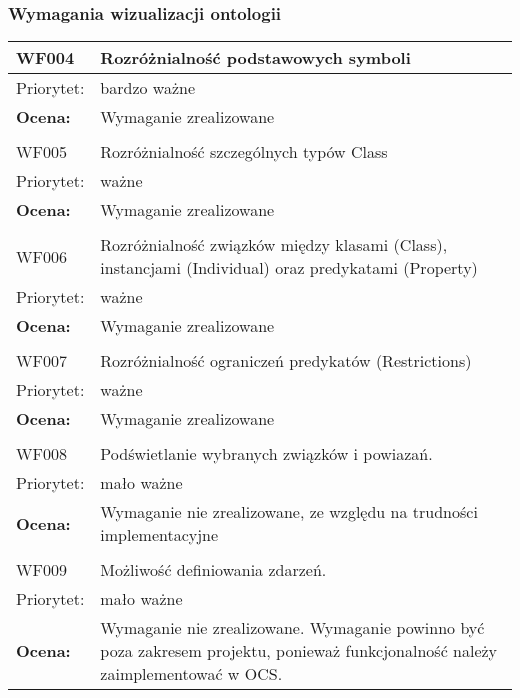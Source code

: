 \subsubsection{Wymagania wizualizacji ontologii}

\begin{center}
\begin{tabular}{|m{3cm}|m{9cm}|} \hline

WF004 & Rozróżnialność podstawowych symboli  \\ \hline
Priorytet: & bardzo ważne \\ \hline
\textbf{Ocena:} & Wymaganie zrealizowane \\ \hline

\multicolumn{2}{c}{} \\
 \hline

WF005 &   Rozróżnialność szczególnych typów Class\\ \hline
Priorytet: &  ważne \\ \hline
\textbf{Ocena:} & Wymaganie zrealizowane \\ \hline
\multicolumn{2}{c}{} \\
 \hline

WF006 &  Rozróżnialność związków między klasami (Class), instancjami (Individual) oraz predykatami (Property)\\ \hline
Priorytet: & ważne \\ \hline
\textbf{Ocena:} & Wymaganie zrealizowane \\ \hline
\multicolumn{2}{c}{} \\
 \hline

WF007 & Rozróżnialność ograniczeń predykatów (Restrictions) \\ \hline
Priorytet: & ważne \\ \hline
\textbf{Ocena:} & Wymaganie zrealizowane \\ \hline
\multicolumn{2}{c}{} \\
 \hline

WF008 &  Podświetlanie wybranych związków i powiazań.\\ \hline
Priorytet: & mało ważne \\ \hline
\textbf{Ocena:} & Wymaganie nie zrealizowane, ze względu na trudności implementacyjne \\ \hline
\multicolumn{2}{c}{} \\
 \hline

WF009 & Możliwość definiowania zdarzeń. \\ \hline
Priorytet: & mało ważne \\ \hline
\textbf{Ocena:} & Wymaganie nie zrealizowane. Wymaganie powinno być poza zakresem projektu, ponieważ funkcjonalność należy zaimplementować w OCS. \\ \hline
\end{tabular}

\end{center}

